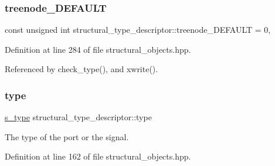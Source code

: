\subsubsection{\texorpdfstring{treenode\+\_\+\+D\+E\+F\+A\+U\+LT}{treenode\_DEFAULT}}
{\footnotesize\ttfamily const unsigned int structural\+\_\+type\+\_\+descriptor\+::treenode\+\_\+\+D\+E\+F\+A\+U\+LT = 0\hspace{0.3cm}{\ttfamily [static]}, {\ttfamily [private]}}



Definition at line 284 of file structural\+\_\+objects.\+hpp.



Referenced by check\+\_\+type(), and xwrite().

\mbox{\label{structstructural__type__descriptor_ac7e81a7cabebeaf41e948a721da11854}} 
\subsubsection{\texorpdfstring{type}{type}}
{\footnotesize\ttfamily \hyperlink{structstructural__type__descriptor_ae12552f84c02a972c2a084901b94cd13}{s\+\_\+type} structural\+\_\+type\+\_\+descriptor\+::type}



The type of the port or the signal. 



Definition at line 162 of file structural\+\_\+objects.\+hpp.



